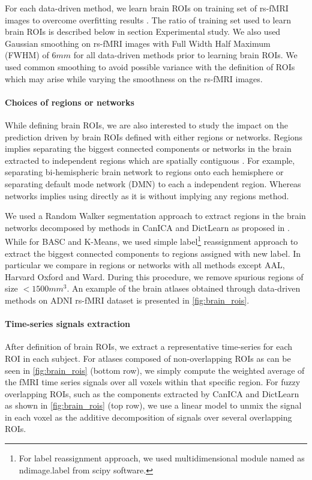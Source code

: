 \documentclass[5p]{elsarticle}
\begin{document}
For each data-driven method, we
learn brain ROIs on training set of rs-fMRI images to overcome overfitting
results \citep{abraham2017deriving}.
The ratio of training set used to learn brain ROIs is described below in section
Experimental study. We also used Gaussian smoothing on rs-fMRI images
with Full Width Half Maximum (FWHM) of $6mm$ for all
data-driven methods prior to learning brain ROIs. We used common smoothing to
avoid possible variance with the definition of ROIs which may arise while
varying the smoothness on the rs-fMRI images.

\paragraph{Choices of regions or networks}
While defining brain ROIs, we are also interested to study the
impact on the prediction driven by brain ROIs defined with either regions
or networks. Regions implies separating the
biggest connected components or networks in the brain extracted to independent
regions which are
spatially contiguous \citep{abraham2014region}. For example, separating
bi-hemispheric brain network to regions onto each hemisphere or separating default
mode network (DMN) to each a independent region.
Whereas networks implies using directly as it is without implying any regions
method.

We used a Random Walker segmentation approach to extract regions in the
brain networks decomposed by methods in CanICA and DictLearn as proposed in
\citep{abraham2014region}. While for BASC and K-Means, we used simple
label\footnote{For label reassignment approach, we used multidimensional
module named as ndimage.label from scipy software.}
reassignment approach to extract the biggest connected components to regions
assigned with new label. In particular we compare in regions or networks with
all methods except AAL, Harvard Oxford and Ward.
During this procedure, we remove
spurious regions of size $< 1500 mm^{3}$. An example of the brain atlases obtained
through data-driven methods on ADNI rs-fMRI dataset is presented in
\autoref{fig:brain_rois}.

\paragraph{Time-series signals extraction}
After definition of brain ROIs, we extract a representative time-series
for each ROI in each subject. For atlases composed of non-overlapping
ROIs as can be seen in \autoref{fig:brain_rois} (bottom row), we simply
compute the weighted average of the fMRI
time series signals over all voxels within that specific region.
For fuzzy overlapping ROIs, such as the components extracted
by CanICA and DictLearn as shown in \autoref{fig:brain_rois} (top row),
we use a linear model to unmix the
signal in each voxel as the additive decomposition of signals
over several overlapping ROIs.
\end{document}
